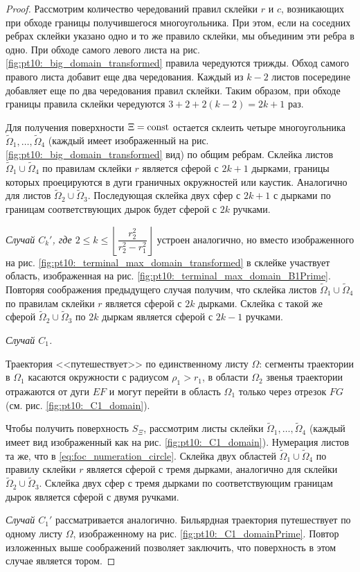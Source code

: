 \begin{proof}
Рассмотрим количество чередований правил склейки $r$ и $c$, возникающих при обходе границы получившегося многоугольника. При этом, если на соседних ребрах склейки указано одно и то же правило склейки, мы объединим эти ребра в одно.
При обходе самого левого листа на рис. \ref{fig:pt10:_big_domain_transformed} правила чередуются трижды. Обход самого правого листа добавит еще два чередования. Каждый из $k-2$ листов посередине добавляет еще по два чередования правил склейки. Таким образом, при обходе границы правила склейки чередуются $3+2+2(k-2) = 2k+1$ раз.

Для получения поверхности $\Xi = \mathrm{const}$ остается склеить четыре многоугольника $\widetilde{\Omega}_1, \ldots, \widetilde{\Omega}_4$ (каждый имеет изображенный на рис. \ref{fig:pt10:_big_domain_transformed} вид) по общим ребрам. 
Склейка листов $\widetilde{\Omega}_1 \cup \widetilde{\Omega}_4$ по правилам склейки $r$ является сферой с $2k+1$ дырками, границы которых проецируются в дуги граничных окружностей или каустик. Аналогично для листов $\widetilde{\Omega}_2 \cup \widetilde{\Omega}_3$. Последующая склейка двух сфер с $2k+1$ с дырками по границам соответствующих дырок будет сферой с $2k$ ручками.

\textit{Случай $C_k'$, где $2 \leq k \leq \left\lfloor \dfrac{r_2^2}{r_2^2-r_1^2} \right\rfloor$} 
устроен аналогично, но вместо  изображенного на рис.    
\ref{fig:pt10:_terminal_max_domain_transformed} в склейке участвует область, изображенная на рис. \ref{fig:pt10:_terminal_max_domain_B1Prime}. Повторяя соображения предыдущего случая получим, что  склейка листов  $\widetilde\Omega_1 \cup \widetilde\Omega_4$ по правилам склейки $r$ является сферой с $2k$ дырками. Склейка с такой же сферой $\widetilde\Omega_2 \cup \widetilde\Omega_3$ по $2k$ дыркам является сферой с $2k-1$ ручками.  

\textit{Случай $C_1$.}

Траектория  <<путешествует>> по единственному листу $\Omega$: сегменты траектории в $\Omega_1$ касаются окружности с радиусом $\rho_1 > r_1$, в области $\Omega_2$ звенья траектории отражаются от дуги $EF$ и  могут перейти в область $\Omega_1$ только через отрезок $FG$ (см. рис. \ref{fig:pt10:_C1_domain}).

Чтобы получить поверхность $S_\Xi$, рассмотрим листы склейки $\widetilde\Omega_1, \ldots, \widetilde\Omega_4$ (каждый имеет вид изображенный как на рис. \ref{fig:pt10:_C1_domain}). Нумерация листов та же, что в \eqref{eq:foc_numeration_circle}. Склейка двух областей $\widetilde{\Omega}_1 \cup \widetilde{\Omega}_4$ по правилу склейки $r$ является сферой с тремя дырками, аналогично для склейки $\widetilde{\Omega}_2 \cup \widetilde{\Omega}_3$. Склейка двух сфер с тремя дырками  по соответствующим границам дырок  является сферой с двумя ручками.

\textit{Случай $C_1'$} рассматривается аналогично. Бильярдная траектория  путешествует по одному листу $\Omega$, изображенному на  рис. \ref{fig:pt10:_C1_domainPrime}. Повтор изложенных выше соображений позволяет заключить, что поверхность в этом случае является тором.
\end{proof}


